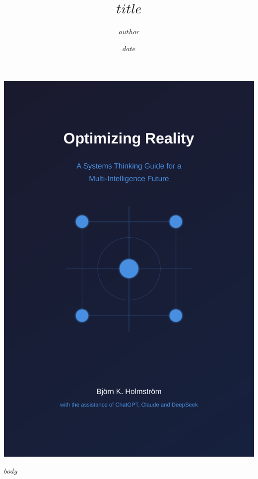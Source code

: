 \documentclass[12pt, a4paper]{book}
\title{$title$}
\author{$author$}
\date{$date$}
\begin{document}
\setlength{\headheight}{27.5pt}

\begin{titlepage}
    \centering
    \vspace*{0cm}
    \includegraphics[width=\textwidth]{book-cover.pdf}
\end{titlepage}

\frontmatter
\maketitle

\mainmatter

$body$
\end{document}
